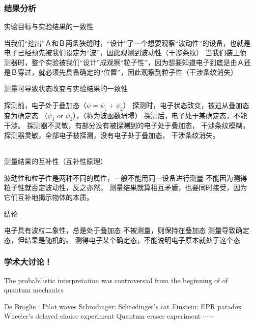 \begin{frame} 
    \frametitle{结果分析}
    \begin{enumerate}
        \Item 实验目标与实验结果的一致性\\
        \begin{itemize}
            \Item 当我们“挖出”Ａ和Ｂ两条狭缝时，“设计”了一个想要观察“波动性”的设备，也就是电子已经预先被我们设定为“波”，因此观测到波动性（干涉条纹）
            \Item 当我们装上侦测器时，整个实验被我们“设计”成观察“粒子性”，因为想要知道电子到底是由Ａ还是Ｂ穿过，就必须先具备确定的“位置”，因此观察到粒子性（干涉条纹消失）
        \end{itemize}
        \Item 测量可导致状态改变与实验结果的一致性 \\
        \begin{itemize}
            \Item 探测前，电子处于叠加态（$ \psi =\psi_1+\psi_2$）
            \Item 探测时，电子状态改变，被迫从叠加态变为确定态 （$\psi_1$ or $\psi_2$），（称为波函数坍塌）
            \Item 探测后，电子处于某确定态，不能干涉。
            \Item 探测器不灵敏，有部分没有被探测到的电子处于叠加态， 干涉条纹模糊。
            \Item 探测器灵敏，全部电子被探测，没有电子处于叠加态， 干涉条纹消失。
        \end{itemize}
        ~~\\
        \Item 测量结果的互补性（互补性原理）\\
        \begin{itemize}
            \Item 波动性和粒子性是两种不同的属性，一般不能用同一设备进行测量
            \Item 不能因为测得粒子性就否定波动性，反之亦然。
            \Item 测量结果就算相互矛盾，也要同时接受，因为它们互补地揭示物体的本质。
        \end{itemize}
        \Item 结论
        \begin{itemize}
            \Item 电子具有波粒二象性，总是处于叠加态
            \Item 不被测量，则保持在叠加态
            \Item 测量导致确定态，但结果是随机的。
            \Item 测得电子某个确定态，不能说明电子原本就处于这个态
        \end{itemize}
    \end{enumerate}
\end{frame}

\begin{frame}
    \frametitle{学术大讨论！}
    The probabilistic interpretation was controversial from the beginning of of quantum mechanics
    \begin{tcolorbox4}
    \begin{itemize}
        \Item De Broglie : Pilot waves
        \Item Schr$\ddot{o}$dinger: Schr$\ddot{o}$dinger's cat
        \Item Einstein: EPR paradox
        \Item Wheeler's delayed choice experiment
        \Item Quantum eraser experiment
        \Item $\cdots \cdots$
    \end{itemize}
    \end{tcolorbox4}
\end{frame}

